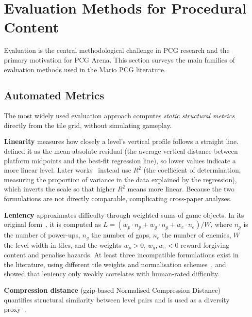\documentclass[shortabstract, mgr, english]{iithesis}
\begin{document}
\section{Evaluation Methods for Procedural Content}
\label{sec:bg-evaluation}

Evaluation is the central methodological challenge in PCG research and the
primary motivation for PCG Arena. This section surveys the main families of
evaluation methods used in the Mario PCG literature.

\subsection{Automated Metrics}
\label{subsec:bg-eval-automated}

The most widely used evaluation approach computes \emph{static structural
metrics} directly from the tile grid, without simulating gameplay.

\textbf{Linearity} measures how closely a level's vertical profile follows a
straight line. \citet{smith2010analyzing} defined it as the mean
absolute residual (the average vertical distance between platform midpoints
and the best-fit regression line), so lower values indicate a more linear
level. Later works~\citep{horn2014comparative,
summerville2017understanding} instead use $R^2$ (the coefficient of determination, measuring
the proportion of variance in the data explained by the regression), which inverts the scale so that higher $R^2$ means more linear. Because the two formulations are not directly comparable, complicating cross-paper analyses.

\textbf{Leniency} approximates difficulty through weighted sums of game objects.
In its original form~\citep{smith2010analyzing}, it is computed as
$L = (w_p \cdot n_p + w_g \cdot n_g + w_e \cdot n_e) / W$, where $n_p$ is the
number of power-ups, $n_g$ the number of gaps, $n_e$ the number of enemies, $W$
the level width in tiles, and the weights $w_p > 0$, $w_g, w_e < 0$ reward
forgiving content and penalise hazards. At least three incompatible formulations exist in the literature, using different
tile weights and normalisation schemes~\citep{smith2010analyzing,
shaker2012evolving, marino2015empirical}, and
\citet{marino2015empirical} showed that leniency only weakly correlates with
human-rated difficulty.

\textbf{Compression distance} (gzip-based Normalised Compression Distance)
quantifies structural similarity between level pairs and is used as a diversity
proxy~\citep{shaker2012evolving, horn2014comparative}.
\end{document}
